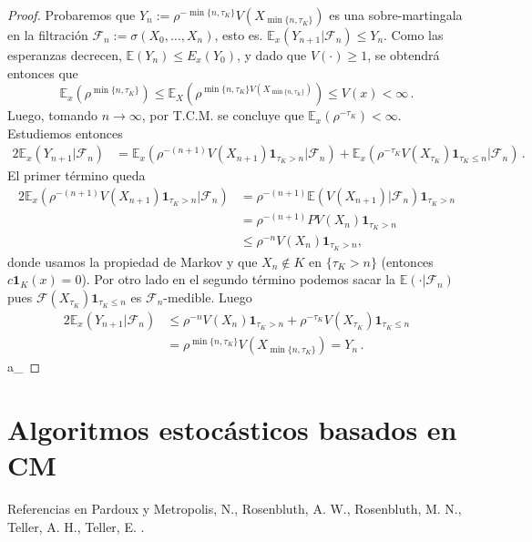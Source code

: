 \documentclass[letterpaper,11pt]{article} %
\theoremstyle{defbreak}
\theoremstyle{propbreak}
\theoremstyle{remark}
\theoremstyle{break}
\def\E{\mathbb{E}}
\def\gris{\color{mygray}}
\def\negro{\color{black}}
\def\findem{\null\hfill\color{white}a\color{black}_\square}
\begin{document}
\begin{proof}
\gris
Probaremos que $Y_n:=\rho^{-\min\{n,\tau_K\}}V(X_{\min\{n,\tau_K\}})$ es una sobre-martingala en la filtración $\mathcal{F}_n:=\sigma(X_0,\dots,X_n)$, esto es. $\E_x(Y_{n+1}|\mathcal{F}_n)\leq Y_n$. Como las esperanzas decrecen, $\E(Y_n)\leq E_x(Y_0)$, y dado que  $V(\cdot)\geq 1$, se obtendr\'a entonces que
$$ \E_x(\rho^{\min\{n,\tau_K\}})\leq\E_X(\rho^{\min\{n,\tau_K\}V(X_{\min\{n,\tau_K\}})})\leq V(x)<\infty \, . $$
Luego, tomando $n\to\infty$, por T.C.M. se concluye que  $\E_x(\rho^{-\tau_K})<\infty$. Estudiemos entonces  
\begin{alignat*}{2}
\E_x(Y_{n+1}|\mathcal{F}_n) & = \E_x(\rho^{-(n+1)}V(X_{n+1})\mathbf{1}_{\tau_K>n}|\mathcal{F}_n)+\E_x(\rho^{-\tau_K}V(X_{\tau_K})\mathbf{1}_{\tau_K\leq n}|\mathcal{F}_n) \, .
\end{alignat*}
El primer término queda
\begin{alignat*}{2}
\E_x(\rho^{-(n+1)}V(X_{n+1})\mathbf{1}_{\tau_K>n}|\mathcal{F}_n) & = \rho^{-(n+1)}\E(V(X_{n+1})|\mathcal{F}_n)\mathbf{1}_{\tau_K>n} \\
& = \rho^{-(n+1)}PV(X_n)\mathbf{1}_{\tau_K>n} \\
& \leq \rho^{-n}V(X_n)\mathbf{1}_{\tau_K>n}, 
\end{alignat*}
donde usamos la propiedad de Markov y que $X_n\notin K$ en $\{\tau_K>n\}$ (entonces  $c\mathbf{1}_{K}(x)=0$). Por otro lado en el segundo término podemos sacar la $\E(\cdot|\mathcal{F}_n)$ pues $\mathcal{F}(X_{\tau_K})\mathbf{1}_{\tau_K\leq n}$ es $\mathcal{F}_n$-medible. Luego
\begin{alignat*}{2}
\E_x(Y_{n+1}|\mathcal{F}_n) & \leq \rho^{-n}V(X_n)\mathbf{1}_{\tau_K>n}+\rho^{-\tau_K}V(X_{\tau_K})\mathbf{1}_{\tau_K\leq n} \\
& = \rho^{\min\{n,\tau_K\}}V(X_{\min\{n,\tau_K\}})=Y_n \, .
\end{alignat*}
\findem
\negro
\end{proof}

\newpage
\section{Algoritmos estocásticos basados en CM}
Referencias en Pardoux \cite{pardoux} y Metropolis, N., Rosenbluth, A. W., Rosenbluth, M. N., Teller, A. H., Teller, E.  \cite{metro}.
\end{document}
